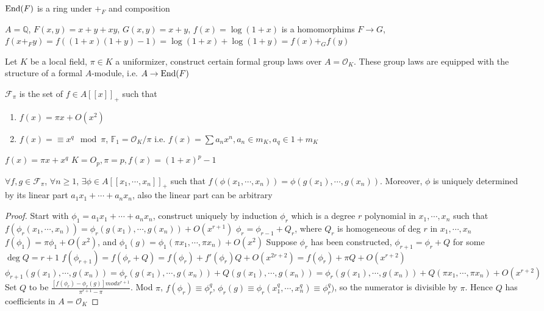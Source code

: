 \documentclass[main]{subfiles}
\begin{document}
\begin{definition}
$\operatorname{End}(F)$ is a ring under $+_F$ and composition
\end{definition}

\begin{example}
$A=\mathbb Q$, $F(x,y)=x+y+xy$, $G(x,y)=x+y$, $f(x)=\log(1+x)$ is a homomorphims $F\to G$, $f(x+_Fy)=f((1+x)(1+y)-1)=\log(1+x)+\log(1+y)=f(x)+_Gf(y)$
\end{example}

Let $K$ be a local field, $\pi\in K$ a uniformizer, construct certain formal group laws over $A=\mathcal O_K$. These group laws are equipped with the structure of a formal $A$-module, i.e. $A\to\operatorname{End}(F)$

\begin{definition}
$\mathscr F_\pi$ is the set of $f\in A[[x]]_+$ such that
\begin{enumerate}
\item $f(x)=\pi x+O(x^2)$
\item $f(x)=\equiv x^q\mod\pi$, $\mathbb F_1=\mathcal O_K/\pi$
i.e. $f(x)=\sum a_nx^n, a_n\in m_K,a_q\in1+m_K$
\end{enumerate}
\end{definition}

\begin{example}
$f(x)=\pi x+x^q$
$K=O_p,\pi=p,f(x)=(1+x)^p-1$
\end{example}

\begin{lemma}
$\forall f,g\in \mathscr F_\pi$, $\forall n\geq1$, $\exists\phi\in A[[x_1,\cdots,x_n]]_+$ such that $f(\phi(x_1,\cdots,x_n))=\phi(g(x_1),\cdots,g(x_n))$. Moreover, $\phi$ is uniquely determined by its linear part $a_1x_1+\cdots+a_nx_n$, also the linear part can be arbitrary
\end{lemma}

\begin{proof}
Start with $\phi_1=a_1x_1+\cdots+a_nx_n$, construct uniquely by induction $\phi_r$ which is a degree $r$ polynomial in $x_1,\cdots,x_n$ such that
$f(\phi_r(x_1,\cdots,x_n))=\phi_r(g(x_1),\cdots,g(x_n))+ O(x^{r+1})$
$\phi_r=\phi_{r-1}+Q_r$, where $Q_r$ is homogeneous of deg $r$ in $x_1,\cdots,x_n$
$f(\phi_1)=\pi\phi_1+O(x^2)$, and $\phi_1(g)=\phi_1(\pi x_1,\cdots,\pi x_n)+O(x^2)$
Suppose $\phi_r$ has been constructed, $\phi_{r+1}=\phi_r+Q$ for some $\deg Q=r+1$
$f(\phi_{r+1})=f(\phi_r+Q)=f(\phi_r)+f'(\phi_r)Q+O(x^{2r+2})=f(\phi_r)+\pi Q+O(x^{r+2})$
$\phi_{r+1}(g(x_1),\cdots,g(x_n))=\phi_r(g(x_1),\cdots,g(x_n))+Q(g(x_1),\cdots,g(x_n))=\phi_r(g(x_1),\cdots,g(x_n))+Q(\pi x_1,\cdots,\pi x_n)+O(x^{r+2})$
Set $Q$ to be $\frac{[f(\phi_r)-\phi_r(g)]mod x^{r+1}}{\pi^{r+1}-\pi}$. Mod $\pi$, $f(\phi_r)\equiv\phi_r^q$, $\phi_r(g)\equiv\phi_r(x_1^q,\cdots,x_n^q)\equiv\phi_r^q)$, so the numerator is divisible by $\pi$. Hence $Q$ has coefficients in $A=\mathcal O_K$
\end{proof}
\end{document}
